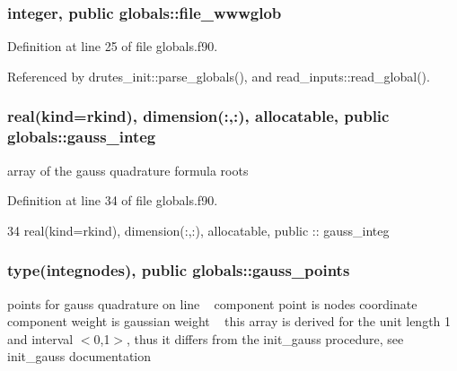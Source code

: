 \subsubsection[{file\+\_\+wwwglob}]{\setlength{\rightskip}{0pt plus 5cm}integer, public globals\+::file\+\_\+wwwglob}\label{namespaceglobals_a4b888a57182c0304bc39d119765d954a}


Definition at line 25 of file globals.\+f90.



Referenced by drutes\+\_\+init\+::parse\+\_\+globals(), and read\+\_\+inputs\+::read\+\_\+global().

\subsubsection[{gauss\+\_\+integ}]{\setlength{\rightskip}{0pt plus 5cm}real(kind=rkind), dimension(\+:,\+:), allocatable, public globals\+::gauss\+\_\+integ}\label{namespaceglobals_a7f4ba768c80911b99b2a184281753b19}


array of the gauss quadrature formula roots 



Definition at line 34 of file globals.\+f90.


\begin{DoxyCode}
34   \textcolor{keywordtype}{real(kind=rkind)}, \textcolor{keywordtype}{dimension(:,:)}, \textcolor{keywordtype}{allocatable}, \textcolor{keywordtype}{public} :: gauss_integ
\end{DoxyCode}
\subsubsection[{gauss\+\_\+points}]{\setlength{\rightskip}{0pt plus 5cm}type({\bf integnodes}), public globals\+::gauss\+\_\+points}\label{namespaceglobals_aabb888860f571ef59f1687fda09a6de8}


points for gauss quadrature on line ~\newline
 component point is node\textquotesingle{}s coordinate ~\newline
 component weight is gaussian weight ~\newline
 this array is derived for the unit length 1 and interval $<$0,1$>$, thus it differs from the init\+\_\+gauss procedure, see init\+\_\+gauss documentation 



